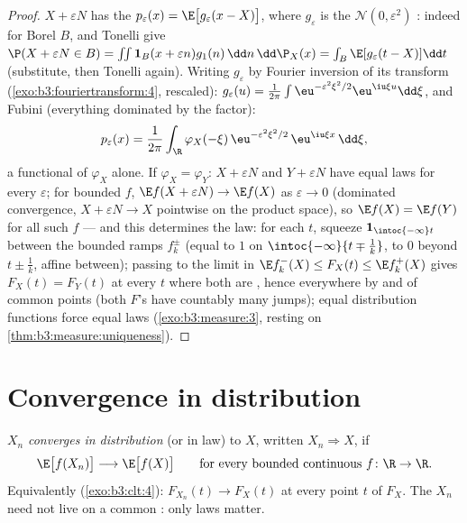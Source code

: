 \begin{proof}
$X + \varepsilon N$ has the  $p_\varepsilon(x) =
\E\bigl[g_\varepsilon(x - X)\bigr]$, where $g_\varepsilon$ is
the $\mathcal N(0, \varepsilon^2)$ : indeed for Borel
$B$,  and Tonelli give $\P(X + \varepsilon N \in
B) = \int\!\!\int\mathbf 1_B(x + \varepsilon
n)g_1(n)\,\dd n\,\dd\P_X(x) = \int_B\E[g_\varepsilon(t -
X)]\dd t$ (substitute, then Tonelli again). Writing
$g_\varepsilon$ by Fourier inversion of its transform
(\cref{exo:b3:fouriertransform:4}, rescaled):
$g_\varepsilon(u) = \frac1{2\pi}\int
\eu^{-\varepsilon^2\xi^2/2}\eu^{\iu\xi u}\dd\xi$, and Fubini
(everything dominated by the  factor):
\[
p_\varepsilon(x) = \frac1{2\pi}\int_\R
\varphi_X(-\xi)\,\eu^{-\varepsilon^2\xi^2/2}\,
\eu^{\iu\xi x}\,\dd\xi ,
\]
a functional of $\varphi_X$ alone. If $\varphi_X =
\varphi_Y$: $X + \varepsilon N$ and $Y + \varepsilon N$ have
equal laws for every $\varepsilon$; for bounded 
$f$, $\E f(X + \varepsilon N) \to \E f(X)$ as $\varepsilon
\to 0$ (dominated convergence, $X + \varepsilon N \to X$
pointwise on the product space), so $\E f(X) = \E f(Y)$ for
all such $f$ --- and this determines the law: for each $t$,
squeeze $\mathbf 1_{\intoc{-\infty}t}$ between the bounded
 ramps $f_k^\pm$ (equal to $1$ on
$\intoc{-\infty}{t \mp \frac1k}$, to $0$ beyond $t \pm
\frac1k$, affine between); passing to the limit in $\E
f_k^-(X) \leq F_X(t) \leq \E f_k^+(X)$ gives $F_X(t) =
F_Y(t)$ at every $t$ where both are , hence
everywhere by  and  of common
 points (both $F$'s have countably many jumps);
equal distribution functions force equal laws
(\cref{exo:b3:measure:3}, resting on
\cref{thm:b3:measure:uniqueness}).
\end{proof}

\section{Convergence in distribution}

\begin{definition}\label{def:b3:clt:cid}
$X_n$ \emph{converges in distribution} (or in law) to $X$,
written $X_n \Rightarrow X$, if
\[
\E\bigl[f(X_n)\bigr] \longrightarrow \E\bigl[f(X)\bigr]
\qquad\text{for every bounded continuous } f\colon\R\to\R .
\]
Equivalently (\cref{exo:b3:clt:4}): $F_{X_n}(t) \to F_X(t)$
at every  point $t$ of $F_X$. The $X_n$ need not
live on a common : only laws matter.
\end{definition}

